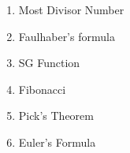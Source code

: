 

\begin{enumerate}
    \normalsize \item Most Divisor Number \par
        \tiny 
    \normalsize \item Faulhaber's formula \par
        \tiny 
    \normalsize \item SG Function \par
        \tiny 
    \normalsize \item Fibonacci \par
        \tiny 
    \normalsize \item Pick's Theorem \par
        \tiny 
    \normalsize \item Euler's Formula \par
        \tiny 
\end{enumerate}